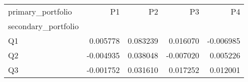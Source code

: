 \begin{tabular}{lrrrr}
\toprule
primary_portfolio & P1 & P2 & P3 & P4 \\
secondary_portfolio &  &  &  &  \\
\midrule
Q1 & 0.005778 & 0.083239 & 0.016070 & -0.006985 \\
Q2 & -0.004935 & 0.038048 & -0.007020 & 0.005226 \\
Q3 & -0.001752 & 0.031610 & 0.017252 & 0.012001 \\
\bottomrule
\end{tabular}
